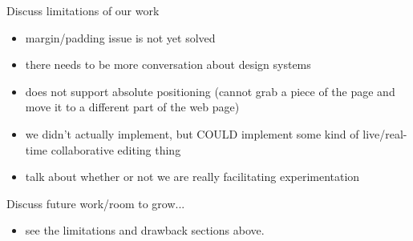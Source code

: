 \documentclass{sigchi}
\begin{document}
Discuss limitations of our work 
\begin{itemize}
    \item margin/padding issue is not yet solved
    \item there needs to be more conversation about design systems
    \item does not support absolute positioning (cannot grab a piece of the page and move it to a different part of the web page)
    \item we didn't actually implement, but COULD implement some kind of live/real-time collaborative editing thing
    \item talk about whether or not we are really facilitating experimentation

\end{itemize}

Discuss future work/room to grow...
\begin{itemize}
    \item see the limitations and drawback sections above. 
\end{itemize}


\balance{}



\end{document}
